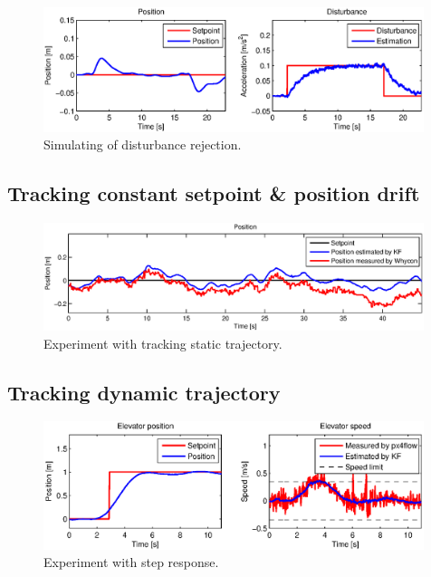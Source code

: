 \begin{figure}[H]
\centering
\includegraphics[width=0.99\textwidth]{fig/simulation4_disturbance_rejection.eps}
\caption{Simulating of disturbance rejection.}
\label{fig:simulation_step_governor}
\end{figure}

\subsection{Tracking constant setpoint \& position drift}

\begin{figure}[H]
\centering
\includegraphics[width=0.99\textwidth]{fig/experiment5_drift_constant.eps}
\caption{Experiment with tracking static trajectory.}
\label{fig:experiment_sine_1}
\end{figure}

\subsection{Tracking dynamic trajectory}
\label{cap:dynamic_trajectory_tracking}

\begin{figure}[h]
\centering
\includegraphics[width=0.99\textwidth]{fig/experiment2_step.eps}
\caption{Experiment with step response.}
\label{fig:experiment_sine_1}
\end{figure}

